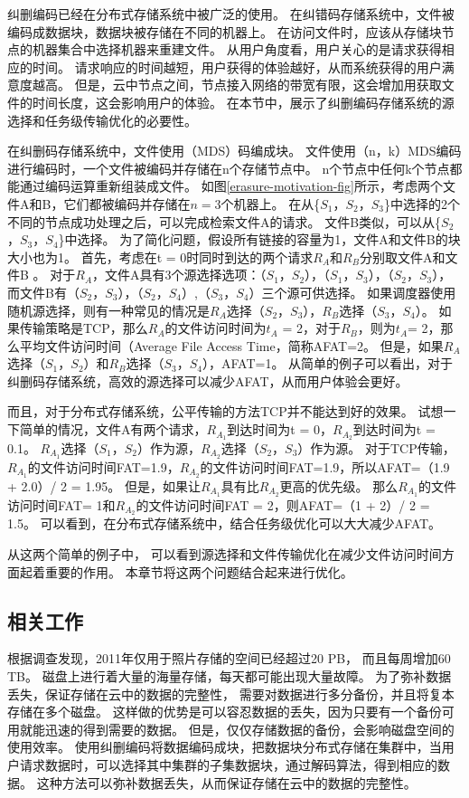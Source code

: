 纠删编码已经在分布式存储系统中被广泛的使用。
在纠错码存储系统中，文件被编码成数据块，数据块被存储在不同的机器上。
在访问文件时，应该从存储块节点的机器集合中选择机器来重建文件。
从用户角度看，用户关心的是请求获得相应的时间。
请求响应的时间越短，用户获得的体验越好，从而系统获得的用户满意度越高。
但是，云中节点之间，节点接入网络的带宽有限，这会增加用获取文件的时间长度，这会影响用户的体验。
在本节中，展示了纠删编码存储系统的源选择和任务级传输优化的必要性。


在纠删码存储系统中，文件使用（MDS）码编成块。
文件使用（n，k）MDS编码进行编码时，一个文件被编码并存储在n个存储节点中。
n个节点中任何k个节点都能通过编码运算重新组装成文件。
如图\ref{erasure-motivation-fig}所示，考虑两个文件A和B，它们都被编码并存储在$n = 3$个机器上。
在从\{$S_1$，$S_2$，$S_3$\}中选择的2个不同的节点成功处理之后，可以完成检索文件A的请求。
文件B类似，可以从\{$S_2$，$S_3$，$S_4$\}中选择。
为了简化问题，假设所有链接的容量为1，文件A和文件B的块大小也为1。
首先，考虑在t = 0时同时到达的两个请求$R_A$和$R_B$分别取文件A和文件B 。
对于$R_A$，文件A具有3个源选择选项：（$S_1$，$S_2$），（$S_1$，$S_3$），（$S_2$，$S_3$），
而文件B有（$S_2$，$S_3$），（$S_2$，$S_4$）,（$S_3$，$S_4$）三个源可供选择。
如果调度器使用随机源选择，则有一种常见的情况是$R_A$选择（$S_2$，$S_3$），$R_B$选择（$S_3$，$S_4$）。
如果传输策略是TCP，那么$R_A$的文件访问时间为$t_A$ = 2，对于$R_B$，则为$t_A$= 2，那么平均文件访问时间（Average File Access Time，简称AFAT=2。
但是，如果$R_A$选择（$S_1$，$S_2$）和$R_B$选择（$S_3$，$S_4$），AFAT=1。
从简单的例子可以看出，对于纠删码存储系统，高效的源选择可以减少AFAT，从而用户体验会更好。

而且，对于分布式存储系统，公平传输的方法TCP并不能达到好的效果。
试想一下简单的情况，文件A有两个请求，$R_{A_1}$到达时间为t = 0，$R_{A_2}$到达时间为t = 0.1。 
$R_{A_1}$选择（$S_1$，$S_2$）作为源，$R_{A_2}$选择（$S_2$，$S_3$）作为源。
对于TCP传输，$R_{A_1}$的文件访问时间FAT=1.9，$R_{A_2}$的文件访问时间FAT=1.9，所以AFAT=（1.9 + 2.0）/ 2 = 1.95。
但是，如果让$R_{A_1}$具有比$R_{A_2}$更高的优先级。
那么$R_{A_1}$的文件访问时间FAT= 1和$R_{A_2}$的文件访问时间FAT = 2，则AFAT=（1 + 2）/ 2 = 1.5。
可以看到，在分布式存储系统中，结合任务级优化可以大大减少AFAT。

从这两个简单的例子中，
可以看到源选择和文件传输优化在减少文件访问时间方面起着重要的作用。
本章节将这两个问题结合起来进行优化。


\subsection{相关工作}
\label{erasure_coding:related_work}
根据调查发现，2011年仅用于照片存储的空间已经超过20 PB，
而且每周增加60 TB\cite{beaver2010finding,li2013erasure}。
磁盘上进行着大量的海量存储，每天都可能出现大量故障。
为了弥补数据丢失，保证存储在云中的数据的完整性，
需要对数据进行多分备份，并且将复本存储在多个磁盘。
这样做的优势是可以容忍数据的丢失，因为只要有一个备份可用就能迅速的得到需要的数据\cite{li2013erasure}。
但是，仅仅存储数据的备份，会影响磁盘空间的使用效率。
使用纠删编码将数据编码成块，把数据块分布式存储在集群中，当用户请求数据时，可以选择其中集群的子集数据块，通过解码算法，得到相应的数据。
这种方法可以弥补数据丢失，从而保证存储在云中的数据的完整性。

